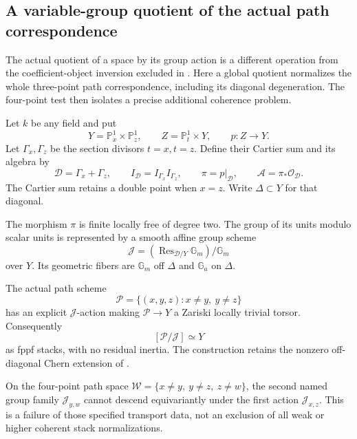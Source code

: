 \subsection{A variable-group quotient of the actual path correspondence}

The actual quotient of a space by its group action
is a different operation from the coefficient-object
inversion excluded in .
Here a global quotient normalizes the whole
 three-point path correspondence, including
its diagonal degeneration. The four-point test
then isolates a precise additional coherence problem.

Let \(k\) be any field and put
\[
 Y=\mathbb P^1_x\times\mathbb P^1_z,\qquad
 Z=\mathbb P^1_t\times Y,\qquad p:Z\to Y.
\]
Let \(\Gamma_x,\Gamma_z\) be the section divisors
\(t=x,t=z\). Define their Cartier sum and its algebra by
\begin{equation}\label{eq:variableQuotientDivisor}
 \mathscr D=\Gamma_x+\Gamma_z,\qquad
 I_{\mathscr D}=I_{\Gamma_x}I_{\Gamma_z},\qquad
 \pi=p|_{\mathscr D},\qquad
 \mathcal A=\pi_*\mathcal O_{\mathscr D}.
\end{equation}
The Cartier sum retains a double point when \(x=z\).
Write \(\Delta\subset Y\) for that diagonal.

\begin{finding}
\label{f:variableGroupQuotient}
The morphism \(\pi\) is finite locally free of degree two.
The group of its units modulo scalar units is represented
by a smooth affine group scheme
\[
 \mathcal J=(\operatorname{Res}_{\mathscr D/Y}\mathbb G_m)/
                         \mathbb G_m
\]
over \(Y\). Its geometric fibers are \(\mathbb G_m\)
off \(\Delta\) and \(\mathbb G_a\) on \(\Delta\).

The actual path scheme
\[
 \mathcal P=\{(x,y,z):x\ne y,\ y\ne z\}
\]
has an explicit \(\mathcal J\)-action making
\(\mathcal P\to Y\) a Zariski locally trivial torsor.
Consequently
\[
                         [\mathcal P/\mathcal J]\simeq Y
\]
as fppf stacks, with no residual inertia.
The construction retains the nonzero off-diagonal
Chern extension of .

On the four-point path space
\(\mathcal W=\{x\ne y,\ y\ne z,\ z\ne w\}\),
the second named group family \(\mathcal J_{y,w}\)
cannot descend equivariantly under the first action
\(\mathcal J_{x,z}\).
This is a failure of those specified transport data,
not an exclusion of all weak or higher coherent
stack normalizations.
\end{finding}


